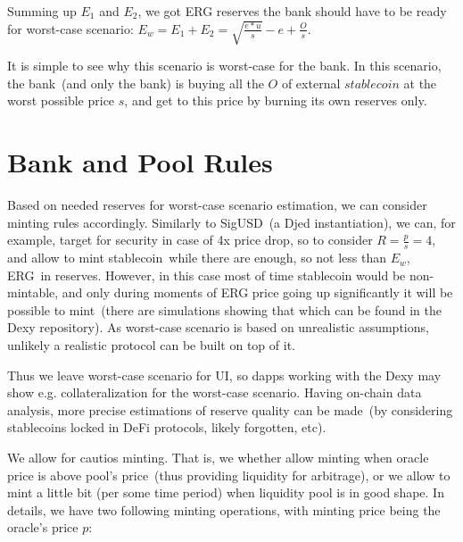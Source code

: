 \documentclass{article}   %
\newcommand{\bc}{ERG}
\newcommand{\sct}{stablecoin}
\newcommand{\dx}{Dexy}
\begin{document}
Summing up $E_1$ and $E_2$, we got \bc{} reserves the bank should have to be ready for worst-case scenario: $E_w = E_1 + E_2 = \sqrt{\frac{e * u}{s}} - e + \frac{O}{s}$.

It is simple to see why this scenario is worst-case for the bank. In this scenario, the bank~(and only the bank) is buying all the $O$ of external $\sct{}$ at the worst possible price $s$, and get to this price by burning its own reserves only.  

\section{Bank and Pool Rules}

Based on needed reserves for worst-case scenario estimation, we can consider minting rules accordingly. Similarly to SigUSD~(a Djed instantiation), we can, for example, target for security in case of 
4x price drop, so to consider $R = \frac{p}{s} = 4$, and allow to mint \sct{}~while there are enough, so not less than $E_w$, \bc{}~in reserves. However, in this case most of time \sct{} would be non-mintable, and only during moments of \bc{} price going up significantly it will be possible to mint~(there are simulations showing that which can be found in the \dx{} repository). As worst-case scenario is based on unrealistic assumptions, unlikely a realistic protocol can be built on top of it.  

Thus we leave worst-case scenario for UI, so dapps working with the \dx{} may show e.g. collateralization for the worst-case scenario. Having on-chain data analysis, 
more precise estimations of reserve quality can be made~(by considering \sct{}s locked in DeFi protocols, likely forgotten, etc).

We allow for cautios minting. That is, we whether allow minting when oracle price is above pool's price~(thus providing liquidity for arbitrage), or we allow to mint a little bit (per some time period) when liquidity pool is in good shape. In details, we have two following minting operations, with minting price being the oracle's price $p$:  
\end{document}
